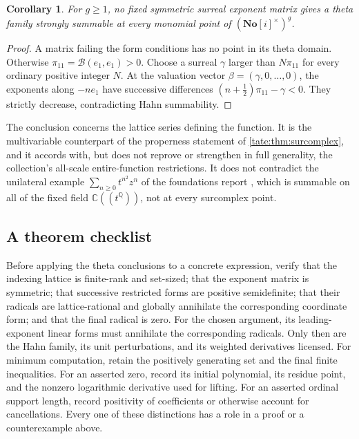 \documentclass[11pt,letterpaper]{article}
\newtheorem{corollary}[corollary]{Corollary}
\theoremstyle{definition}
\newcommand{\C}{\mathbb C}
\newcommand{\Q}{\mathbb Q}
\newcommand{\No}{\mathbf{No}}
\newcommand{\cB}{\mathcal B}
\begin{document}
\begin{corollary}\label{tate:theta:cor:notentire}
For $g\ge1$, no fixed symmetric surreal exponent matrix gives a theta
family strongly summable at every monomial point of $(\No[i]^\times)^g$.
\end{corollary}

\begin{proof}
A matrix failing the form conditions has no point in its theta domain.
Otherwise $\pi_{11}=\cB(e_1,e_1)>0$. Choose a surreal $\gamma$ larger than
$N\pi_{11}$ for every ordinary positive integer $N$. At the valuation
vector $\beta=(\gamma,0,\ldots,0)$, the exponents along $-ne_1$ have
successive differences $(n+\tfrac12)\pi_{11}-\gamma<0$. They strictly
decrease, contradicting Hahn summability.
\end{proof}

The conclusion concerns the lattice series defining the function. It is the
multivariable counterpart of the properness statement of
\cref{tate:thm:surcomplex}, and it accords with, but does not reprove or
strengthen in full generality, the collection's all-scale entire-function
restrictions. It does not contradict the unilateral example
$\sum_{n\ge0}t^{n^2}z^n$ of the foundations report \cite{RepoFoundations},
which is summable on all of the fixed field $\C((t^\Q))$, not at every
surcomplex point.

\subsection{A theorem checklist}\label{tate:theta:sec:checklist}

Before applying the theta conclusions to a concrete expression, verify
that the indexing lattice is finite-rank and set-sized; that the exponent
matrix is symmetric; that successive restricted forms are positive
semidefinite; that their radicals are lattice-rational and globally
annihilate the corresponding coordinate form; and that the final radical
is zero. For the chosen argument, its leading-exponent linear forms must
annihilate the corresponding radicals. Only then are the Hahn family, its
unit perturbations, and its weighted derivatives licensed. For minimum
computation, retain the positively generating set and the final finite
inequalities. For an asserted zero, record its initial polynomial, its
residue point, and the nonzero logarithmic derivative used for lifting.
For an asserted ordinal support length, record positivity of coefficients
or otherwise account for cancellations. Every one of these distinctions has
a role in a proof or a counterexample above.
\end{document}
